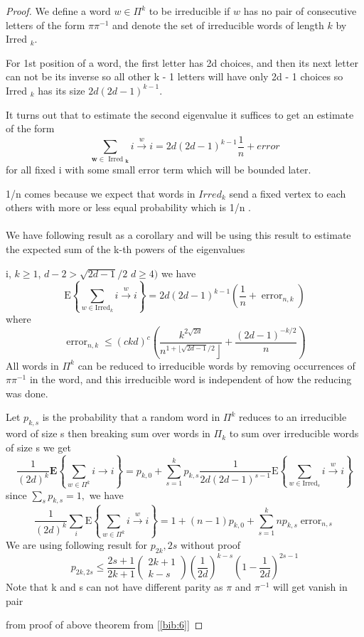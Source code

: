 \documentclass[oneside]{book}
\begin{document}
\begin{proof}
		We define a word $w \in \Pi^{k}$ to be irreducible if $w$ has no pair of consecutive letters of the form $\pi \pi^{-1}$ and denote the set of irreducible words of length $k$ by Irred $_{k} .$\par
		For 1st position of a word, the first letter has  2d choices, and then its next letter can not be its inverse so all other k - 1 letters will have only 2d - 1 choices so
		Irred $_{k}$ has its  size $2 d(2 d-1)^{k-1} .$ \par 
		It turns out that to estimate the second eigenvalue it suffices
		to get an estimate of the form
		$$
		\sum_{\boldsymbol{w} \in \text { Irred }_{\boldsymbol{k}}} i \stackrel{w}{\rightarrow} i=2 d(2 d-1)^{k-1} \frac{1}{n} + error 
		$$
		for all fixed i with some small error term which will be bounded later.\par
		1/n comes because we expect  that words in $Irred_{k} $ send a fixed vertex to each  others with more or less equal probability which is 1/n . \\\\
		We have following result as a corollary and will be using this result to estimate the expected sum of the k-th powers of the eigenvalues \par
		 i, $k \geq 1$,  $d-2>\sqrt{2 d-1} / 2$  $d \geq 4)$ we have
		$$
		\mathrm{E}\left\{\sum_{w \in \mathrm{Irred}_{k}} i \stackrel{w}{\rightarrow} i\right\}=2 d(2 d-1)^{k-1}\left(\frac{1}{n}+\operatorname{error}_{n, k}\right)
		$$
		where
		$$
		\operatorname{error}_{n, k} \leq(c k d)^{c}\left(\frac{k^{2 \sqrt{2 d}}}{\left.n^{1+\lfloor\sqrt{2 d-1} / 2}\right\rfloor}+\frac{(2 d-1)^{-k / 2}}{n}\right)
		$$
		All words in $\Pi^{k}$ can be reduced to irreducible words by removing occurrences of $\pi \pi^{-1}$ in the word, and this irreducible word is independent of how the reducing was done. \par 
		Let  $p_{k,s}$ is the probability that a random word in  $\Pi^{k}$ reduces to an irreducible word of size s then breaking sum over words in  $\Pi_k$ to sum over irreducible words of size s  we get  
		$$
		\frac{1}{(2 d)^{k}} \mathbf{E}\left\{\sum_{w \in \Pi^{k}} i\rightarrow i\right\}=p_{k, 0}+\sum_{s=1}^{k} p_{k, s} \frac{1}{2 d(2 d-1)^{s-1}} \mathrm{E}\left\{\sum_{w \in \mathrm{Irred}_{s}} i \stackrel{w}{\rightarrow} i\right\}
		$$
		since $\sum_{s} p_{k, s}=1,$ we have
		$$ 
		\frac{1}{(2 d)^{k}} \sum_{i} \mathrm{E}\left\{\sum_{w \in \Pi^{k}} i \stackrel{w}{\rightarrow} i\right\}=1+(n-1) p_{k, 0}+\sum_{s=1}^{k} n p_{k, s} \operatorname{error}_{n, s} 
		$$     
		We are using following result for $p_{2k},{2s}$ without proof%
		$$
		p_{2 k, 2 s} \leq \frac{2 s+1}{2 k+1}\left(\begin{array}{c}
		2 k+1 \\
		k-s
		\end{array}\right)\left(\frac{1}{2 d}\right)^{k-s}\left(1-\frac{1}{2 d}\right)^{2 s-1}
		$$
		Note that k and s can not have different parity as  $\pi$ and $\pi^{-1}$ will get vanish in pair\par
		from proof of above theorem from [\ref{bib:6}]
		

\end{proof}
\end{document}
